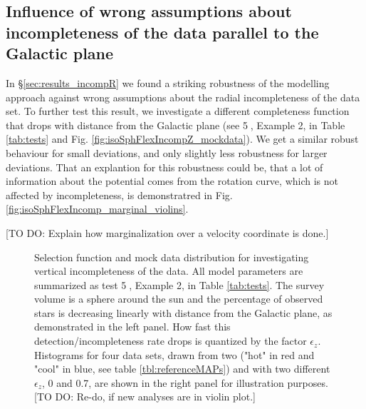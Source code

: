 \subsection{Influence of wrong assumptions about incompleteness of the data parallel to the Galactic plane} \label{sec:incompZ}

In \S\ref{sec:results_incompR} we found a striking robustness of the \RM modelling approach against wrong assumptions about the radial incompleteness of the data set. To further test this result, we investigate a different completeness function that drops with distance from the Galactic plane (see \textcircled{5}, Example 2, in Table \ref{tab:tests} and Fig. \ref{fig:isoSphFlexIncompZ_mockdata}). We get a similar robust behaviour for small deviations, and only slightly less robustness for larger deviations. That an explantion for this robustness could be, that a lot of information about the potential comes from the rotation curve, which is not affected by incompleteness, is demonstratred in Fig. \ref{fig:isoSphFlexIncomp_marginal_violins}.

[TO DO: Explain how marginalization over a velocity coordinate is done.]


\begin{figure}
\caption{Selection function and mock data distribution for investigating vertical incompleteness of the data. All model parameters are summarized as test \textcircled{5}, Example 2, in Table \ref{tab:tests}. The survey volume is a sphere around the sun and the percentage of observed stars is decreasing linearly with distance from the Galactic plane, as demonstrated in the left panel. How fast this detection/incompleteness rate drops is quantized by the factor $\epsilon_z$. Histograms for four data sets, drawn from two \MAPs ("hot" in red and "cool" in blue, see table \ref{tbl:referenceMAPs}) and with two different $\epsilon_z$, 0 and 0.7, are shown in the right panel for illustration purposes. [TO DO: Re-do, if new analyses are in violin plot.]} 
\label{fig:incompZ_mockdata}
\end{figure}



